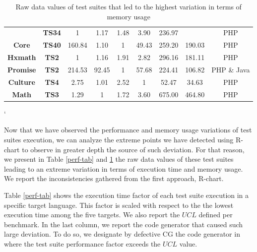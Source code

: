 \begin{table}[h]
{\begin{tabular}{|c|c|c|c|c|c|c|c|c|}
			& \textbf{TS34}       & 1                              & 1.17        & 1.48         & 3.90        & \cellcolor[HTML]{E8E8E8}236.97       &                          & PHP                   \\ \cline{2-7} \cline{9-9} 
			\multirow{-8}{*}{\textbf{Core}}  & \textbf{TS40}       & 160.84                         & 1.10        & 1            & 49.43       & \cellcolor[HTML]{E8E8E8}259.20       & \multirow{-8}{*}{190.03} & PHP                   \\ \hline
			\textbf{Hxmath}                  & \textbf{TS2}        & 1                              & 1.16        & 1.91         & 2.82        & \cellcolor[HTML]{E8E8E8}296.16       & 181.11                   & PHP                   \\ \hline
			\textbf{Promise}                 & \textbf{TS2}        & \cellcolor[HTML]{E8E8E8}214.53 & 92.45       & 1            & 57.68       & \cellcolor[HTML]{E8E8E8}224.41       & 106.82                   & PHP \& Java           \\ \hline
			\textbf{Culture}                 & \textbf{TS4}        & 2.75                           & 1.01        & 2.52         & 1           & \cellcolor[HTML]{E8E8E8}52.47        & 34.63                    & PHP                   \\ \hline
			\textbf{Math}                    & \textbf{TS3}        & 1.29                           & 1           & 1.72         & 3.60        & \cellcolor[HTML]{E8E8E8}675.00       & 464.80                   & PHP                   \\ \hline
		\end{tabular}%
	}
	\caption{Raw data values of test suites that led to the highest variation in terms of memory usage}
	\label{mem-tab}`
\end{table}

Now that we have observed the performance and memory usage variations of test suites execution, we can analyze the extreme points we have detected using R-chart to observe in greater depth the source of such deviation.
For that reason, we present in Table \ref{perf-tab} and \ref{mem-tab} the raw data values of these test suites leading to an extreme variation in terms of execution time and memory usage. We report the inconsistencies gathered from the first approach, R-chart.

Table \ref{perf-tab} shows the execution time factor of each test suite execution in a specific target language. This factor is scaled with respect to the the lowest execution time among the five targets. We also report the $UCL$ defined per benchmark. In the last column, we report the code generator that caused such large deviation. To do so, we designate by defective CG the code generator in where the test suite performance factor exceeds the $UCL$ value.

